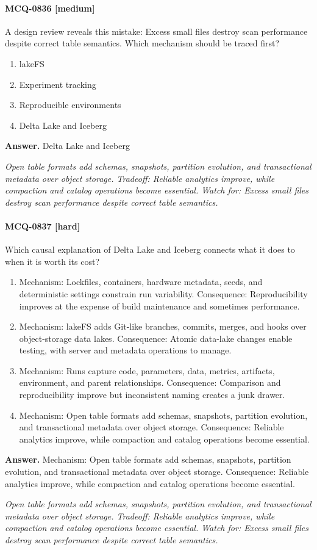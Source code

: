 \paragraph{MCQ-0836 [medium]} A design review reveals this mistake: Excess small files destroy scan performance despite correct table semantics. Which mechanism should be traced first?
\begin{enumerate}[label=\Alph*.]
\item lakeFS
\item Experiment tracking
\item Reproducible environments
\item Delta Lake and Iceberg
\end{enumerate}
\noindent\textbf{Answer.} Delta Lake and Iceberg
\par\textit{Open table formats add schemas, snapshots, partition evolution, and transactional metadata over object storage. Tradeoff: Reliable analytics improve, while compaction and catalog operations become essential. Watch for: Excess small files destroy scan performance despite correct table semantics.}
\paragraph{MCQ-0837 [hard]} Which causal explanation of Delta Lake and Iceberg connects what it does to when it is worth its cost?
\begin{enumerate}[label=\Alph*.]
\item Mechanism: Lockfiles, containers, hardware metadata, seeds, and deterministic settings constrain run variability. Consequence: Reproducibility improves at the expense of build maintenance and sometimes performance.
\item Mechanism: lakeFS adds Git-like branches, commits, merges, and hooks over object-storage data lakes. Consequence: Atomic data-lake changes enable testing, with server and metadata operations to manage.
\item Mechanism: Runs capture code, parameters, data, metrics, artifacts, environment, and parent relationships. Consequence: Comparison and reproducibility improve but inconsistent naming creates a junk drawer.
\item Mechanism: Open table formats add schemas, snapshots, partition evolution, and transactional metadata over object storage. Consequence: Reliable analytics improve, while compaction and catalog operations become essential.
\end{enumerate}
\noindent\textbf{Answer.} Mechanism: Open table formats add schemas, snapshots, partition evolution, and transactional metadata over object storage. Consequence: Reliable analytics improve, while compaction and catalog operations become essential.
\par\textit{Open table formats add schemas, snapshots, partition evolution, and transactional metadata over object storage. Tradeoff: Reliable analytics improve, while compaction and catalog operations become essential. Watch for: Excess small files destroy scan performance despite correct table semantics.}
